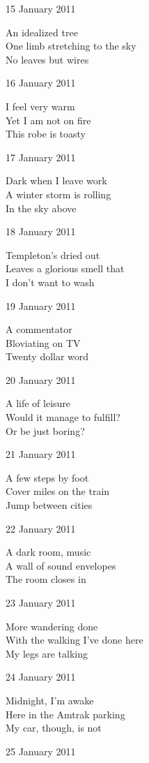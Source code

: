 \documentclass[12pt]{article}
\begin{document}
15 January 2011

An idealized tree \\
One limb stretching to the sky \\
No leaves but wires

16 January 2011

I feel very warm \\
Yet I am not on fire \\
This robe is toasty

17 January 2011

Dark when I leave work \\
A winter storm is rolling \\
In the sky above


\newpage

18 January 2011

Templeton's dried out \\
Leaves a glorious smell that \\
I don't want to wash

19 January 2011

A commentator \\
Bloviating on TV \\
Twenty dollar word

20 January 2011

A life of leisure \\
Would it manage to fulfill? \\
Or be just boring?

21 January 2011

A few steps by foot \\
Cover miles on the train \\
Jump between cities

22 January 2011

A dark room, music \\
A wall of sound envelopes \\
The room closes in

23 January 2011

More wandering done \\
With the walking I've done here \\
My legs are talking

24 January 2011

Midnight, I'm awake \\
Here in the Amtrak parking \\
My car, though, is not


\newpage

25 January 2011
\end{document}
